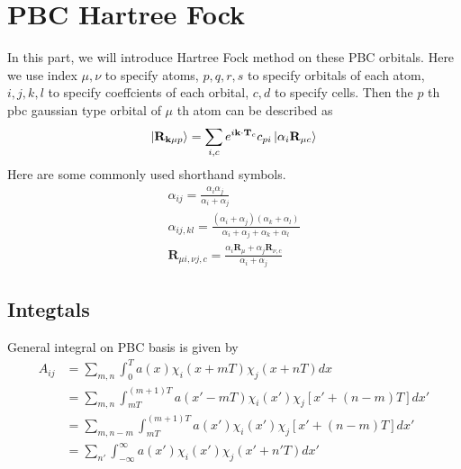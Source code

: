 \documentclass{article}
\begin{document}
\section{PBC Hartree Fock}
    In this part, we will introduce Hartree Fock method on these PBC orbitals.
    Here we use index $\mu,\nu$ to specify atoms,
    $p,q,r,s$ to specify orbitals of each atom,
    $i,j,k,l$ to specify coeffcients of each orbital,
    $c,d$ to specify cells.
    Then the $p$ th pbc gaussian type orbital of $\mu$ th atom can be described as
    \begin{equation}
        \ket{\textbf{R}_{\textbf{k}\mu p}} = \sum_{i,c}e^{i\textbf{k}\cdot\textbf{T}_c}c_{pi}\ket{\alpha_{i}\textbf{R}_{\mu c}}
    \end{equation}
    Here are some commonly used shorthand symbols.
    \begin{gather*}
        \alpha_{ij} = \frac{\alpha_i\alpha_j}{\alpha_i+\alpha_j} \\
        \alpha_{ij,kl} = \frac{(\alpha_i+\alpha_j)(\alpha_k+\alpha_l)}{\alpha_i+\alpha_j+\alpha_k+\alpha_l} \\
        \textbf{R}_{\mu i,\nu j,c} = \frac{\alpha_i\textbf{R}_{\mu}+\alpha_j\textbf{R}_{\nu,c}}{\alpha_i+\alpha_j}
    \end{gather*}

    \subsection{Integtals}
        General integral on PBC basis is given by
        \begin{align*}
            A_{ij} &= \sum_{m,n}\int_0^T a(x)\chi_i(x+mT)\chi_j(x+nT)dx \\
            &= \sum_{m,n}\int_{mT}^{(m+1)T} a(x'-mT)\chi_i(x')\chi_j[x'+(n-m)T]dx' \\
            &= \sum_{m,n-m}\int_{mT}^{(m+1)T} a(x')\chi_i(x')\chi_j[x'+(n-m)T]dx' \\
            &= \sum_{n'}\int_{-\infty}^{\infty} a(x')\chi_i(x')\chi_j(x'+n'T)dx'
        \end{align*}
\end{document}
